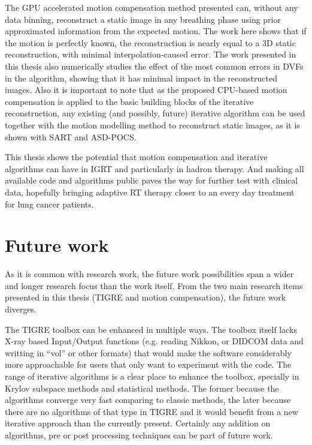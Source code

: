 The GPU accelerated motion compensation method presented can, without any data binning, reconstruct a static image in any breathing phase using prior approximated information from the expected motion. The work here shows that if the motion is perfectly known, the reconstruction is nearly equal to a 3D static reconstruction, with minimal interpolation-caused error. The work presented in this thesis also numerically studies the effect of the most common errors in DVFs in the algorithm, showing that it has minimal impact in the reconstructed images. Also it is important to note that as the proposed CPU-based motion compensation is applied to the basic building blocks of the iterative reconstruction, any existing (and possibly, future) iterative algorithm can be used together with the motion modelling method to reconstruct static images, as it is shown with SART and ASD-POCS. 

This thesis shows the potential that motion compensation and iterative algorithms can have in IGRT and particularly in hadron therapy. And making all available code and algorithms public paves the way for further test with clinical data, hopefully bringing adaptive RT therapy closer to an every day treatment for lung cancer patients.


\section{Future work}

As it is common with research work, the future work possibilities span a wider and longer research focus than the work itself. From the two main research items presented  in this thesis (TIGRE and motion compensation), the future work diverges.

The TIGRE toolbox can be enhanced in multiple ways. The toolbox itself lacks X-ray based Input/Output functions (e.g. reading Nikkon, or DIDCOM data and writting in ``vol'' or other formats) that would make the software considerably more approachable for users that only want to experiment with the code. The range of iterative algorithms is a clear place to enhance the toolbox, specially in Krylov subspace methods and statistical methods. The former because the algorithms converge very fast comparing to classic methods, the later because there are no algorithms of that type in TIGRE and it would benefit from a new iterative approach than the currently present. Certainly any addition on algorithms, pre or post processing techniques can be part of future work.


